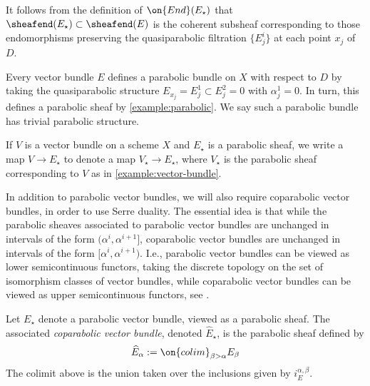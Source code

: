 \begin{remark}
\notready
	\label{remark:end-definition}
	It follows from the definition of $\on{End}(E_\star)$ that
	$\sheafend(E_\star) \subset \sheafend(E)$ is the coherent subsheaf
corresponding to those endomorphisms preserving the quasiparabolic filtration
$\{E^i_j\}$ at each point $x_j$ of $D$.
\end{remark}

\begin{example}
\notready
	\label{example:vector-bundle}
	Every vector bundle $E$ defines a parabolic bundle on $X$ with respect
	to $D$ by taking the quasiparabolic structure
	$E_{x_j} = E_j^1 \subset E_{j}^2 = 0$ with $\alpha_j^1 = 0$.
	In turn, this defines a parabolic sheaf by \autoref{example:parabolic}.
	We say such a parabolic bundle has trivial parabolic structure.
\end{example}
\begin{remark}
\notready
	\label{remark:map-vector-bundle-to-parabolic}
	If $V$ is a vector bundle on a scheme $X$ and $E_\star$ is a parabolic
	sheaf, we write a map $V \to E_\star$ to denote a map $V_\star \to
	E_\star$, where $V_\star$ is the parabolic sheaf corresponding to $V$ as
	in \autoref{example:vector-bundle}.
\end{remark}


In addition to parabolic vector bundles, we will also require coparabolic vector
bundles, in order to use Serre duality.
The essential idea is that while the parabolic sheaves associated to parabolic vector bundles are unchanged in intervals of
the form $(\alpha^i, \alpha^{i+1}]$, coparabolic vector bundles are unchanged in
intervals of the form $[\alpha^i, \alpha^{i+1})$.
I.e., parabolic vector bundles can be viewed as lower semicontinuous functors, taking
the discrete topology on the set of isomorphism classes of vector bundles, while coparabolic vector
bundles
can be viewed as upper semicontinuous functors, see \cite[Figure
1]{bodenY:moduli-spaces-of-parabolic-higgs-bundles}.
\begin{definition}
	\label{definition:coparabolic-vector-bundle}
	Let $E_\star$ denote a parabolic vector bundle, viewed as a parabolic
	sheaf.
	The associated {\em coparabolic vector bundle}, denoted
	$\widehat{E}_\star$, is the parabolic sheaf defined by
		$$\widehat{E}_\alpha :=
			\on{colim}_{\beta > \alpha} E_{\beta} $$
	The colimit above is the union taken over the inclusions given by
	$i^{\alpha,\beta}_E$.
\end{definition}


